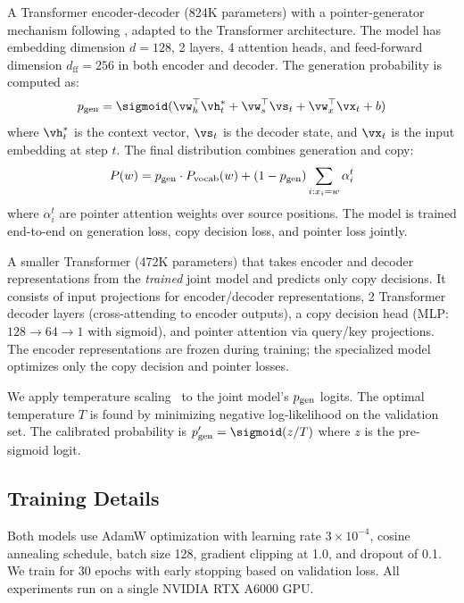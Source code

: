 A Transformer encoder-decoder (824K parameters) with a pointer-generator mechanism following \citet{see2017get}, adapted to the Transformer architecture. The model has embedding dimension $d = 128$, 2 layers, 4 attention heads, and feed-forward dimension $d_{\text{ff}} = 256$ in both encoder and decoder. The generation probability is computed as:
\begin{equation}
    \pgen = \sigmoid(\vw_h^\top \vh_t^* + \vw_s^\top \vs_t + \vw_x^\top \vx_t + b)
    \label{eq:pgen}
\end{equation}
where $\vh_t^*$ is the context vector, $\vs_t$ is the decoder state, and $\vx_t$ is the input embedding at step $t$. The final distribution combines generation and copy:
\begin{equation}
    P(w) = p_{\text{gen}} \cdot P_{\text{vocab}}(w) + (1 - p_{\text{gen}}) \sum_{i: x_i = w} \alpha_i^t
    \label{eq:final_dist}
\end{equation}
where $\alpha_i^t$ are pointer attention weights over source positions. The model is trained end-to-end on generation loss, copy decision loss, and pointer loss jointly.

 A smaller Transformer (472K parameters) that takes encoder and decoder representations from the \emph{trained} joint model and predicts only copy decisions. It consists of input projections for encoder/decoder representations, 2 Transformer decoder layers (cross-attending to encoder outputs), a copy decision head (MLP: $128 \to 64 \to 1$ with sigmoid), and pointer attention via query/key projections. The encoder representations are frozen during training; the specialized model optimizes only the copy decision and pointer losses.

 We apply temperature scaling~\cite{guo2017calibration} to the joint model's $p_{\text{gen}}$ logits. The optimal temperature $T$ is found by minimizing negative log-likelihood on the validation set. The calibrated probability is $\pgen' = \sigmoid(z / T)$ where $z$ is the pre-sigmoid logit.

\subsection{Training Details}
\label{sec:training}

Both models use AdamW optimization with learning rate $3 \times 10^{-4}$, cosine annealing schedule, batch size 128, gradient clipping at 1.0, and dropout of 0.1. We train for 30 epochs with early stopping based on validation loss. All experiments run on a single NVIDIA RTX A6000 GPU.

